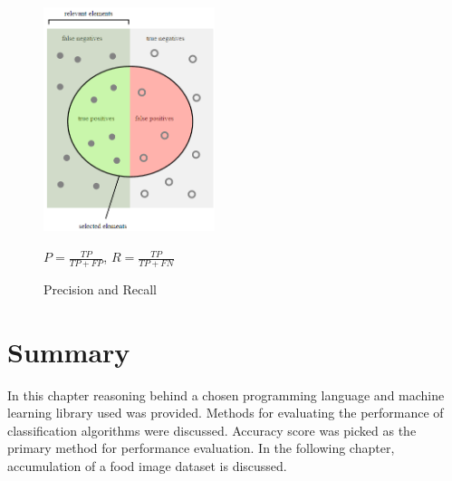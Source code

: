 \begin{figure}[ht]
\centering
\includegraphics[width=5cm]{Figures/Capture.PNG}
\caption{Precision and Recall \citep{wiki:p}}
\( P =\frac{TP}{TP+ FP}\),
\( R =\frac{TP}{TP+ FN}\)
\label{fig:p}
\end{figure}


\section{Summary}
In this chapter reasoning behind a chosen programming language and machine learning library used was provided. Methods for evaluating the performance of classification algorithms were discussed. Accuracy score was picked as the primary method for performance evaluation. In the following chapter, accumulation of a food image dataset is discussed.